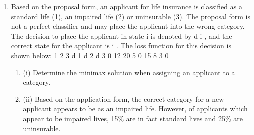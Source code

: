 \documentclass[a4paper,12pt]{article}
\begin{document}
\begin{enumerate}
\item Based on the proposal form, an applicant for life insurance is classified as a standard life (1), an impaired life (2) or uninsurable (3). The proposal form is not a perfect classifier and may place the applicant into the wrong category.
The decision to place the applicant in state i is denoted by d i , and the correct state for the applicant is i .
The loss function for this decision is shown below:
1
2
3
d 1 d 2 d 3
0
12
20 5
0
15 8
3
0

\begin{enumerate}
\item (i) Determine the minimax solution when assigning an applicant to a category. 
\item (ii) Based on the application form, the correct category for a new applicant appears to be as an impaired life. However, of applicants which appear to be impaired lives, 15\% are in fact standard lives and 25\% are uninsurable.


\end{enumerate}
\end{enumerate}
\end{document}
